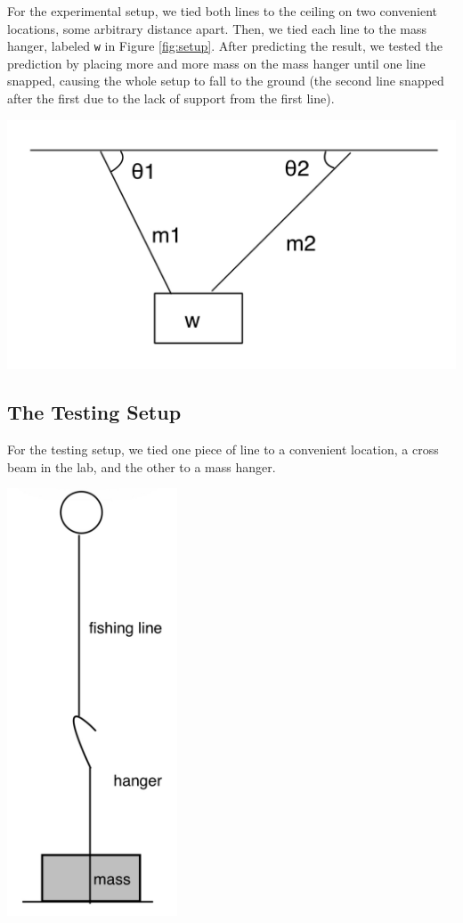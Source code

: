 \documentclass[12pt]{article}
\begin{document}
For the experimental setup, we tied both lines to the ceiling on two convenient locations, some arbitrary distance apart. Then, we tied each line to the mass hanger, labeled \texttt{w} in Figure \ref{fig:setup}. After predicting the result, we tested the prediction by placing more and more mass on the mass hanger until one line snapped, causing the whole setup to fall to the ground (the second line snapped after the first due to the lack of support from the first line).

\begin{center}
\includegraphics[width=6.5in]{./lab4diagram.png}
\end{center}
\subsection{The Testing Setup}
\label{sec:org6e44a0f}

For the testing setup, we tied one piece of line to a convenient location, a cross beam in the lab, and the other to a mass hanger.

\begin{center}
\includegraphics[height=5in]{./lab4hanger.png}
\end{center}
\end{document}

